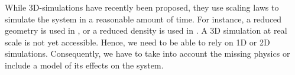 While \ac{3D}-simulations have recently been proposed, they use scaling laws to simulate the system in a reasonable amount of time\citep{taccogna2019a}.
For instance, a reduced geometry is used in \citet{taccogna2018}, or a reduced density is used in \citet{fubiani2018a}.
A \ac{3D} simulation at real scale is not yet accessible.
Hence, we need to be able to rely on \ac{1D} or \ac{2D} simulations.
Consequently, we have to take into account the missing physics or include a model of its effects on the system.
